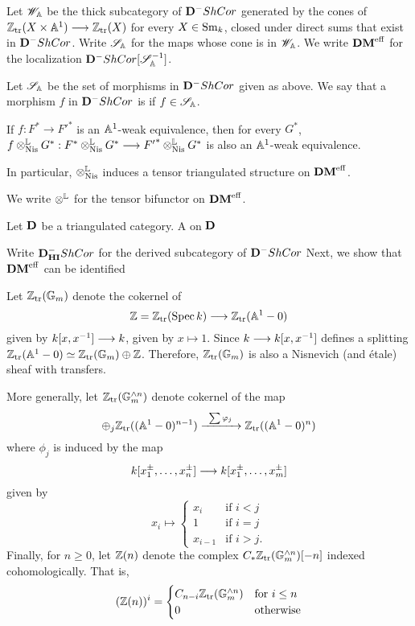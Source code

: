 Let $\Cat{W}_{\A}$ be the thick subcategory of $\DCat^-\ShCor$ 
generated by the cones of $\Ztr(X \times \A^1) \to \Ztr(X)$ for 
every $X \in \Sm$, closed under direct sums that exist in 
$\DCat^-\ShCor$. Write $\Cat{S}_{\A}$ for the maps whose cone is
in $\Cat{W}_{\A}$. We write $\DMeff$ for the localization
$\DCat^-\ShCor[\Cat{S}_{\A}^{-1}]$.

\begin{defn}
Let $\Cat{S}_{\A}$ be the set of morphisms in $\DCat^-\ShCor$ 
given as above. We say that a morphism $f$ in $\DCat^-\ShCor$ is
 if $f \in \Cat{S}_{\A}$.
\end{defn}

\begin{lem}
If $f : F^* \to {F'}^*$ is an $\A^1$-weak equivalence, then for
every $G^*$, $f \tLNis G^* : F^* \tLNis G^* \to {F'}^* \tLNis 
G^*$ is also an $\A^1$-weak equivalence.

In particular, $\tLNis$ induces a tensor triangulated structure
on $\DMeff$.
\end{lem}

We write $\tL$ for the tensor bifunctor on $\DMeff$.

\begin{defn}
Let $\DCat$ be a triangulated category. A 
on $\DCat$
\end{defn}

Write $\DCat_{\HI}^-\ShCor$ for the derived subcategory of 
$\DCat^- \ShCor$ 
Next, we show that $\DMeff$ can be identified


\begin{defn}\label{def_z_n}
Let $\Ztr(\Gm)$ denote the cokernel of
\[
\Z = \Ztr(\Spec \basefield) \to \Ztr(\A^1 - 0)
\]
given by $\basefield [x, x^{-1}] \to \basefield$, given by
$x \mapsto 1$. Since $\basefield \to \basefield[x, x^{-1}]$
defines a splitting $\Ztr(\A^1 - 0) \simeq \Ztr(\Gm) \oplus \Z$.
Therefore, $\Ztr(\Gm)$ is also a Nisnevich (and \'etale) sheaf 
with transfers. 

More generally, let $\Ztr(\Gmn{n})$ denote cokernel of the map 
\[
\oplus_j \Ztr((\A^1 - 0)^{n - 1}) \xrightarrow{\;\;\sum \phi_j\;\;}
\Ztr((\A^1 - 0)^n)
\]
where $\phi_j$ is induced by the map
\[
\basefield[x_1^{\pm},\dots,x_n^{\pm}] \to \basefield[x_1^{\pm},
\dots, x_m^{\pm}]
\]
given by
\[
x_i \mapsto
\begin{cases}
x_i &\textrm{if } i < j \\
1   &\textrm{if } i = j \\
x_{i - 1} &\textrm{if } i > j.
\end{cases}
\]
Finally, for $n \geq 0$, let $\Z(n)$ denote the complex $\suslC 
\Ztr(\Gmn{n})[-n]$ indexed cohomologically. That is, 
\[
(\Z(n))^i = \begin{cases}
\suslC[n - i]\Ztr(\Gmn{n}) & \textrm{for }i \leq n \\
0 & \textrm{otherwise}
\end{cases}
\]
\end{defn}

